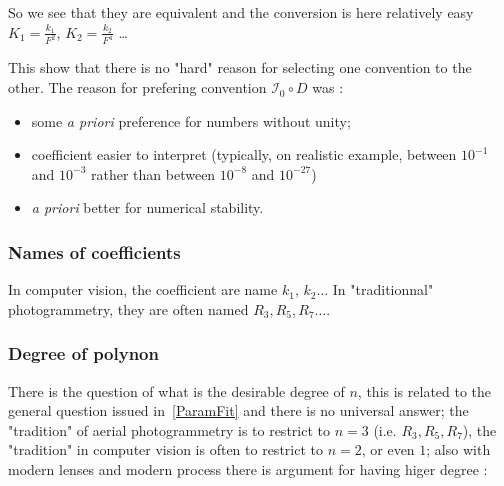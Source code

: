 So we see that they are equivalent and the conversion is here relatively easy  $K_1 = \frac{k_1}{F^2} $,
$K_2 = \frac{k_2}{F^4} $ \dots

This show  that there is no "hard" reason for selecting one convention to the other. The reason for
prefering convention  $\mathcal{I}_0  \circ D$ was :

\begin{itemize}
    \item some \emph{a priori} preference for numbers without unity;

    \item coefficient easier to interpret (typically, on realistic example, between $10^{-1}$ and $10^{-3}$ rather than between $10^{-8}$ and  $10^{-27}$)

    \item \emph{a priori} better for numerical stability.
\end{itemize}


\subsubsection{Names of coefficients}

In computer vision, the coefficient are name $k_1$, $k_2 \dots$ 
In  "traditionnal" photogrammetry, they are often named $R_3,R_5,R_7\dots$.


\subsubsection{Degree of polynon}

There is the question of what is the desirable degree of $n$, this is related to the general question issued in~\ref{ParamFit}
and there is no universal answer;  the "tradition" of aerial photogrammetry is to restrict to $n=3$  (i.e. $R_3,R_5,R_7$),
the "tradition" in computer vision is often to restrict to $n=2$, or even $1$;  also with modern lenses and modern
process there is argument for having higer degree  :
           
